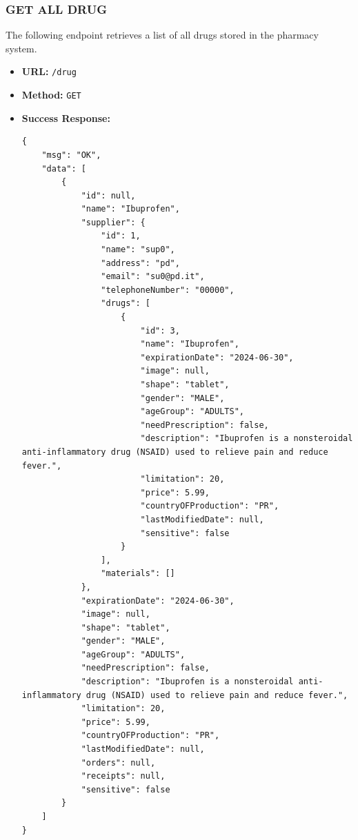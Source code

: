 \subsubsection*{GET ALL DRUG}
The following endpoint retrieves a list of all drugs stored in the pharmacy system.
\begin{itemize}
    \item \textbf{URL:}
    \newline \hspace*{1cm} \texttt{/drug}  
    \item \textbf{Method:}
    \newline \hspace*{1cm}\texttt{GET}
    \item \textbf{Success Response:}
\begin{lstlisting}[breaklines]
{
    "msg": "OK",
    "data": [
        {
            "id": null,
            "name": "Ibuprofen",
            "supplier": {
                "id": 1,
                "name": "sup0",
                "address": "pd",
                "email": "su0@pd.it",
                "telephoneNumber": "00000",
                "drugs": [
                    {
                        "id": 3,
                        "name": "Ibuprofen",
                        "expirationDate": "2024-06-30",
                        "image": null,
                        "shape": "tablet",
                        "gender": "MALE",
                        "ageGroup": "ADULTS",
                        "needPrescription": false,
                        "description": "Ibuprofen is a nonsteroidal anti-inflammatory drug (NSAID) used to relieve pain and reduce fever.",
                        "limitation": 20,
                        "price": 5.99,
                        "countryOFProduction": "PR",
                        "lastModifiedDate": null,
                        "sensitive": false
                    }
                ],
                "materials": []
            },
            "expirationDate": "2024-06-30",
            "image": null,
            "shape": "tablet",
            "gender": "MALE",
            "ageGroup": "ADULTS",
            "needPrescription": false,
            "description": "Ibuprofen is a nonsteroidal anti-inflammatory drug (NSAID) used to relieve pain and reduce fever.",
            "limitation": 20,
            "price": 5.99,
            "countryOFProduction": "PR",
            "lastModifiedDate": null,
            "orders": null,
            "receipts": null,
            "sensitive": false
        }
    ]
}

\end{lstlisting}
\end{itemize}

